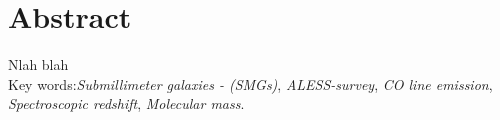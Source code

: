 \begingroup
\let\clearpage\relax
\let\cleardoublepage\relax
\let\cleardoublepage\relax

\chapter*{Abstract}


\vfill

Nlah blah\medskip \\

Key words:\textit{Submillimeter galaxies - (SMGs)}, \textit{ALESS-survey}, \textit{CO line emission}, \textit{Spectroscopic redshift}, \textit{Molecular mass}.

\endgroup			

\vfill